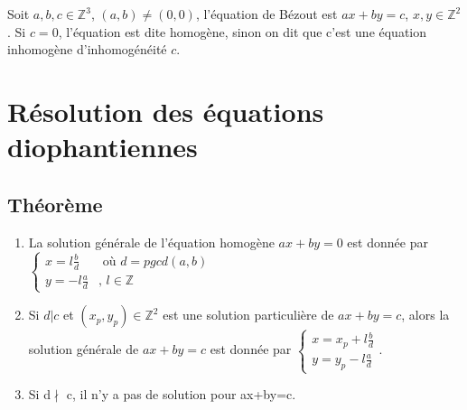 \documentclass[a4paper,10pt]{book} %
\newcommand{\Z}{\mathbb{Z}}
\begin{document}
Soit $a,b,c\in \Z^3$, $(a,b)\neq (0,0)$, l'équation de Bézout est $ax+by=c$, $x,y\in \Z^2$.
Si $c=0$, l'équation est dite homogène, sinon on dit que c'est une équation inhomogène d’inhomogénéité $c$.

\newpage

\section{Résolution des équations diophantiennes}
\subsection{Théorème}
\begin{enumerate}
\item La solution générale de l'équation homogène $ax+by=0$ est donnée par $\left\{\begin{array}{rll}
x=l\frac{b}{d}&\text{ où } d=pgcd(a,b)\\
y=-l\frac{a}{d}&\text{, } l\in \Z
\end{array}\right.$

\item Si $d|c$ et $(x_p,y_p)\in\Z^2$ est une solution particulière de $ax+by=c$, alors la solution générale de $ax+by=c$ est donnée par $\left\{\begin{array}{rcl}
x=x_p+l\frac{b}{d}\\
y=y_p-l\frac{a}{d}
\end{array}\right.$.

\item Si d$\nmid$ c, il n'y a pas de solution pour ax+by=c.
\end{enumerate}
\end{document}
